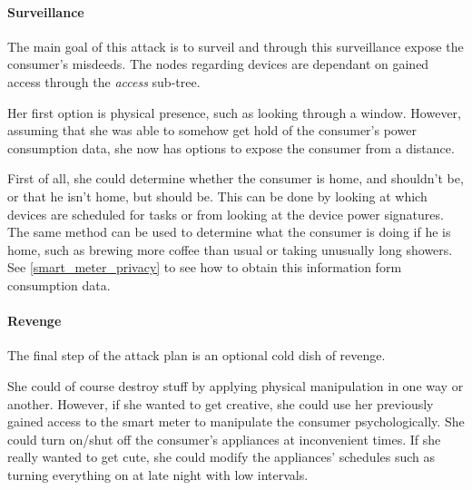 \paragraph{Surveillance}
The main goal of this attack is to surveil and through this surveillance expose the consumer's misdeeds.
The nodes regarding devices are dependant on gained access through the \textit{access} sub-tree.

Her first option is physical presence, such as looking through a window.
However, assuming that she was able to somehow get hold of the consumer's power consumption data, she now has options to expose the consumer from a distance.

First of all, she could determine whether the consumer is home, and shouldn't be, or that he isn't home, but should be.
This can be done by looking at which devices are scheduled for tasks or from looking at the device power signatures.
The same method can be used to determine what the consumer is doing if he is home, such as brewing more coffee than usual or taking unusually long showers.
See \cref{smart_meter_privacy} to see how to obtain this information form consumption data.

\paragraph{Revenge}
The final step of the attack plan is an optional cold dish of revenge.

She could of course destroy stuff by applying physical manipulation in one way or another.
However, if she wanted to get creative, she could use her previously gained access to the smart meter to manipulate the consumer psychologically.
She could turn on/shut off the consumer's appliances at inconvenient times.
If she really wanted to get cute, she could modify the appliances' schedules such as turning everything on at late night with low intervals.